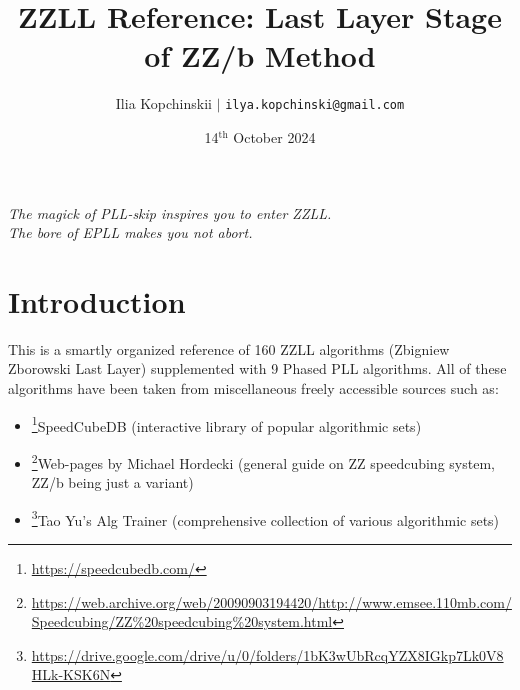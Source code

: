 \documentclass[a4paper]{article}
\title{\vspace{-15mm}\textbf{ZZLL Reference: Last Layer Stage of ZZ/b Method}}
\author{Ilia Kopchinskii $\mid$ \texttt{ilya.kopchinski@gmail.com}}
\date{14$^\text{th}$ October 2024}
\begin{document}
\maketitle
\thispagestyle{empty}

\begin{flushright}
\emph{\large The magick of PLL-skip inspires you to enter ZZLL. \\[3pt]
The bore of EPLL makes you not abort.}
\end{flushright}

\vspace{-1em}
\section*{Introduction}
%

This is a smartly organized reference of 160 ZZLL algorithms (Zbigniew Zborowski Last Layer) supplemented with 9 Phased PLL algorithms. All of these algorithms have been taken from miscellaneous freely accessible sources such as:
\begin{itemize}
\item \footnote{\url{https://speedcubedb.com/}}SpeedCubeDB (interactive library of popular algorithmic sets)
\item \footnote{\url{https://web.archive.org/web/20090903194420/http://www.emsee.110mb.com/Speedcubing/ZZ\%20speedcubing\%20system.html}}Web-pages by Michael Hordecki (general guide on ZZ speedcubing system, ZZ/b being just a variant)
\item \footnote{\url{https://drive.google.com/drive/u/0/folders/1bK3wUbRcqYZX8IGkp7Lk0V8HLk-KSK6N}}Tao Yu's Alg Trainer (comprehensive collection of various algorithmic sets)
\end{itemize}
\end{document}
